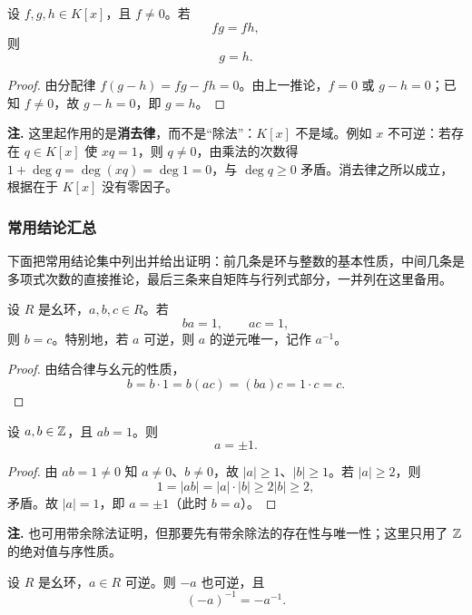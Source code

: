 \begin{corollary}[消去律]
设 \(f,g,h\in K[x]\)，且 \(f\ne0\)。若
\[
fg=fh,
\]
则
\[
g=h .
\]
\end{corollary}

\begin{proof}
由分配律 \(f(g-h)=fg-fh=0\)。由上一推论，\(f=0\) 或 \(g-h=0\)；已知 \(f\ne0\)，故 \(g-h=0\)，即 \(g=h\)。
\end{proof}

\noindent\textbf{注.} 这里起作用的是\textbf{消去律}，而不是“除法”：\(K[x]\) 不是域。例如 \(x\) 不可逆：若存在 \(q\in K[x]\) 使 \(xq=1\)，则 \(q\ne0\)，由乘法的次数得 \(1+\deg q=\deg(xq)=\deg1=0\)，与 \(\deg q\ge0\) 矛盾。消去律之所以成立，根据在于 \(K[x]\) 没有零因子。

\subsubsection{常用结论汇总}

\noindent 下面把常用结论集中列出并给出证明：前几条是环与整数的基本性质，中间几条是多项式次数的直接推论，最后三条来自矩阵与行列式部分，一并列在这里备用。

\begin{proposition}[逆元唯一]
设 \(R\) 是幺环，\(a,b,c\in R\)。若
\[
ba=1,\qquad ac=1,
\]
则 \(b=c\)。特别地，若 \(a\) 可逆，则 \(a\) 的逆元唯一，记作 \(a^{-1}\)。
\end{proposition}

\begin{proof}
由结合律与幺元的性质，
\[
b=b\cdot1=b(ac)=(ba)c=1\cdot c=c .
\]
\end{proof}

\begin{proposition}[整数环中的可逆元]
设 \(a,b\in\mathbb{Z}\)，且 \(ab=1\)。则
\[
a=\pm1 .
\]
\end{proposition}

\begin{proof}
由 \(ab=1\ne0\) 知 \(a\ne0\)、\(b\ne0\)，故 \(|a|\ge1\)、\(|b|\ge1\)。若 \(|a|\ge2\)，则
\[
1=|ab|=|a|\cdot|b|\ge2|b|\ge2,
\]
矛盾。故 \(|a|=1\)，即 \(a=\pm1\)（此时 \(b=a\)）。
\end{proof}

\noindent\textbf{注.} 也可用带余除法证明，但那要先有带余除法的存在性与唯一性；这里只用了 \(\mathbb{Z}\) 的绝对值与序性质。

\begin{proposition}[逆元的负号]
设 \(R\) 是幺环，\(a\in R\) 可逆。则 \(-a\) 也可逆，且
\[
(-a)^{-1}=-a^{-1}.
\]
\end{proposition}

